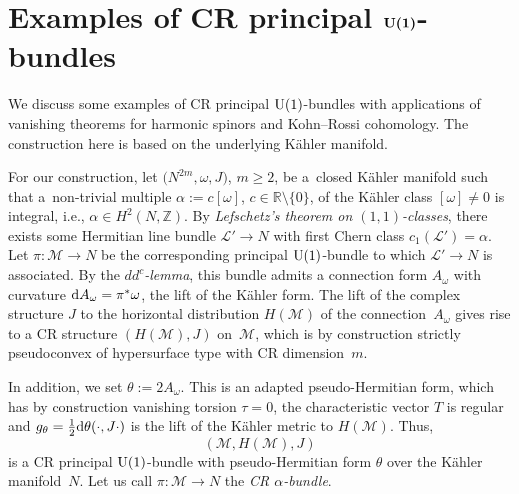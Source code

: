\documentclass[pdftex]{sigma}
\numberwithin{equation}{section}
\newcommand{\RR}{\mathbb{R}}
\newcommand{\ZZ}{\mathbb{Z}}
\begin{document}
\section[Examples of CR principal U(1)-bundles]{Examples of CR principal $\boldsymbol{{\rm U}(1)}$-bundles} \label{Sec12}

We discuss some examples of CR principal ${\rm U}(1)$-bundles with applications of vanishing theorems
for harmonic spinors and Kohn--Rossi cohomology. The construction here is based on the underlying K\"ahler manifold.

For our construction, let $\big(N^{2m},\omega,J\big)$, $m\geq 2$,
be a~closed K\"ahler manifold such that a~non-trivial multiple $\alpha:=c[\omega]$, $c\in\RR\setminus \{0\}$, of the K\"ahler class $[\omega]\neq 0$
is integral, i.e., $\alpha\in H^2(N,\ZZ)$. By {\em Lefschetz's theorem on $(1,1)$-classes}, there exists
some Hermitian line bundle $\mathcal{L}'\to N$ with first Chern class $c_1(\mathcal{L}')=\alpha$.
Let $\pi\colon \mathcal{M}\to N$ be the corresponding
principal ${\rm U}(1)$-bundle to which $\mathcal{L}'\to N$ is associated. By the {\em $dd^c$-lemma},
this bundle admits a connection form $A_\omega$ with curvature ${\rm d}A_\omega=\pi^*\omega$,
the lift of the K\"ahler form.
The lift of the complex structure $J$ to the horizontal distribution $H(\mathcal{M})$ of the connection~$A_\omega$ gives rise to a CR structure $(H(\mathcal{M}),J)$
on~$\mathcal{M}$, which is by construction strictly pseudoconvex of hypersurface type with CR dimension~$m$.

In addition, we set $\theta:=2A_\omega$. This is an adapted pseudo-Hermitian form, which has by construction vanishing torsion $\tau=0$,
the characteristic vector $T$ is regular and $g_\theta=\frac{1}{2}{\rm d}\theta(\cdot,J\cdot)$
is the lift of the K\"ahler metric to $H(\mathcal{M})$. Thus,
\[
(\mathcal{M}, H(\mathcal{M}), J)
\]
is a CR principal ${\rm U}(1)$-bundle with pseudo-Hermitian form $\theta$ over the K\"ahler manifold~$N$.
Let us call $\pi\colon \mathcal{M}\to N$ the {\em CR $\alpha$-bundle}.
\end{document}
